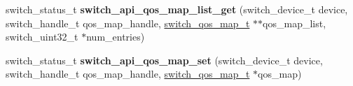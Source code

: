\begin{DoxyCompactItemize}
\item 
\hypertarget{group__QOS_ga837999ef665d73f3426009b41ac32611}{switch\+\_\+status\+\_\+t {\bfseries switch\+\_\+api\+\_\+qos\+\_\+map\+\_\+list\+\_\+get} (switch\+\_\+device\+\_\+t device, switch\+\_\+handle\+\_\+t qos\+\_\+map\+\_\+handle, \hyperlink{group__QOS_gaa37a048e432bfdb7113ab1c1a28f52ff}{switch\+\_\+qos\+\_\+map\+\_\+t} $\ast$$\ast$qos\+\_\+map\+\_\+list, switch\+\_\+uint32\+\_\+t $\ast$num\+\_\+entries)}\label{group__QOS_ga837999ef665d73f3426009b41ac32611}

\item 
\hypertarget{group__QOS_gaec4a3e96e0e68416c158a94f0e3e28cf}{switch\+\_\+status\+\_\+t {\bfseries switch\+\_\+api\+\_\+qos\+\_\+map\+\_\+set} (switch\+\_\+device\+\_\+t device, switch\+\_\+handle\+\_\+t qos\+\_\+map\+\_\+handle, \hyperlink{group__QOS_gaa37a048e432bfdb7113ab1c1a28f52ff}{switch\+\_\+qos\+\_\+map\+\_\+t} $\ast$qos\+\_\+map)}\label{group__QOS_gaec4a3e96e0e68416c158a94f0e3e28cf}

\end{DoxyCompactItemize}


